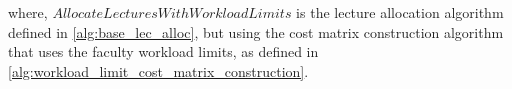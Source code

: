where, $AllocateLecturesWithWorkloadLimits$ is the lecture allocation algorithm defined in \autoref{alg:base_lec_alloc}, but using the cost matrix construction algorithm that uses the faculty workload limits, as defined in \autoref{alg:workload_limit_cost_matrix_construction}.






